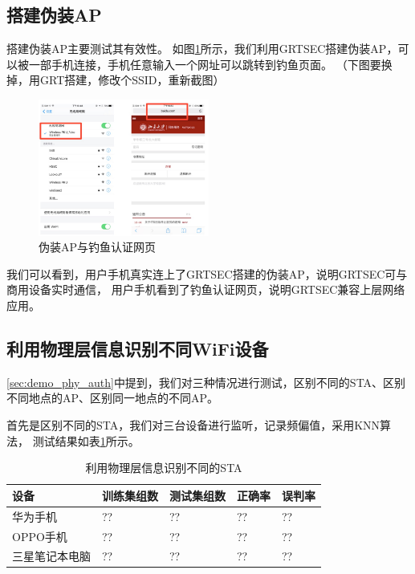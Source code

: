     \subsection{搭建伪装AP}
    搭建伪装AP主要测试其有效性。
    如图\ref{fig:envaluation_fake_ap}所示，我们利用GRTSEC搭建伪装AP，可以被一部手机连接，手机任意输入一个网址可以跳转到钓鱼页面。
    （下图要换掉，用GRT搭建，修改个SSID，重新截图）
  		\begin{figure}[H]
  			\centering
  			\includegraphics[width=0.5\textwidth]{img/WirelessPKU_fake_1.jpg}
  			\caption{伪装AP与钓鱼认证网页}
  			\label{fig:envaluation_fake_ap}
  		\end{figure}

    我们可以看到，用户手机真实连上了GRTSEC搭建的伪装AP，说明GRTSEC可与商用设备实时通信，
    用户手机看到了钓鱼认证网页，说明GRTSEC兼容上层网络应用。

    \subsection{利用物理层信息识别不同WiFi设备}
    \ref{sec:demo_phy_auth}中提到，我们对三种情况进行测试，区别不同的STA、区别不同地点的AP、区别同一地点的不同AP。

    首先是区别不同的STA，我们对三台设备进行监听，记录频偏值，采用KNN算法，
    测试结果如表\ref{tab:envaluate_identify_sta}所示。
      \begin{table}[!hbp]
      \centering
      \caption{利用物理层信息识别不同的STA}
      \label{tab:envaluate_identify_sta}
        \begin{tabular}{|l|l|l|l|l|} \hline
        设备 & 训练集组数 & 测试集组数 & 正确率 & 误判率 \\ \hline
        华为手机 & ?? & ?? & ?? & ?? \\ \hline
        OPPO手机 & ?? & ?? & ?? & ?? \\ \hline
        三星笔记本电脑 & ?? & ?? & ?? & ?? \\ \hline
        \end{tabular}
      \end{table}

